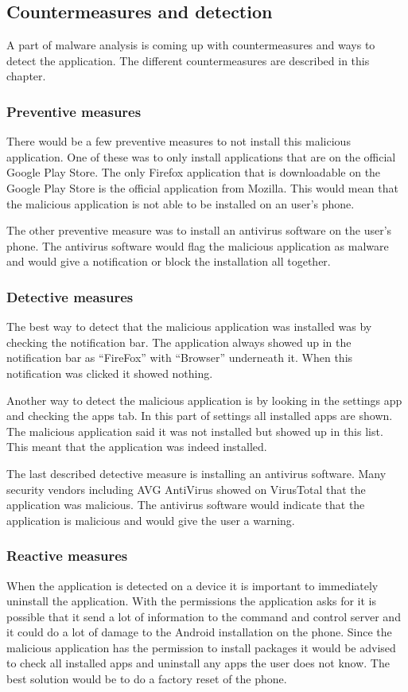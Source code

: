 \subsection{Countermeasures and detection}
A part of malware analysis is coming up with countermeasures and ways to detect the application.
The different countermeasures are described in this chapter.

\subsubsection{Preventive measures}
There would be a few preventive measures to not install this malicious application.
One of these was to only install applications that are on the official Google Play Store.
The only Firefox application that is downloadable on the Google Play Store is the official application from Mozilla.
This would mean that the malicious application is not able to be installed on an user’s phone.

The other preventive measure was to install an antivirus software on the user’s phone.
The antivirus software would flag the malicious application as malware and would give a notification or block the installation all together.

\subsubsection{Detective measures}
The best way to detect that the malicious application was installed was by checking the notification bar.
The application always showed up in the notification bar as “FireFox” with “Browser” underneath it.
When this notification was clicked it showed nothing.

Another way to detect the malicious application is by looking in the settings app and checking the apps tab.
In this part of settings all installed apps are shown.
The malicious application said it was not installed but showed up in this list.
This meant that the application was indeed installed.

The last described detective measure is installing an antivirus software.
Many security vendors including AVG AntiVirus showed on VirusTotal that the application was malicious.
The antivirus software would indicate that the application is malicious and would give the user a warning.

\subsubsection{Reactive measures}
When the application is detected on a device it is important to immediately uninstall the application.
With the permissions the application asks for it is possible that it send a lot of information to the command and control server and it could do a lot of damage to the Android installation on the phone.
Since the malicious application has the permission to install packages it would be advised to check all installed apps and uninstall any apps the user does not know.
The best solution would be to do a factory reset of the phone.

